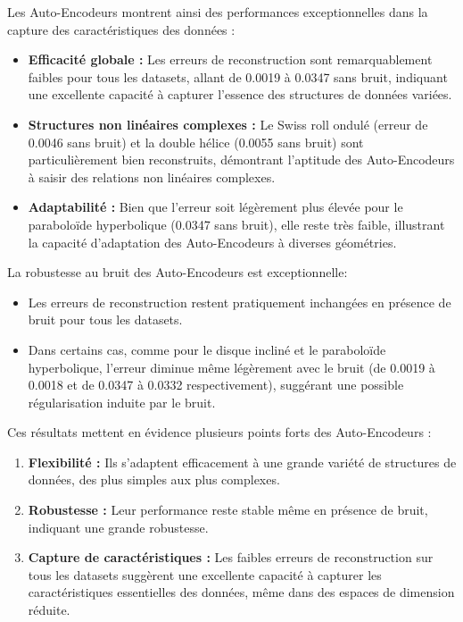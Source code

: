 \documentclass[unnumsec,webpdf,modern,large]{projet_manifold}%
\theoremstyle{thmstyleone}%
\theoremstyle{thmstyletwo}%
\theoremstyle{thmstylethree}%
\begin{document}
Les Auto-Encodeurs montrent ainsi des performances exceptionnelles dans la capture des caractéristiques des données :

\begin{itemize}
    \item \textbf{Efficacité globale :} Les erreurs de reconstruction sont remarquablement faibles pour tous les datasets, allant de 0.0019 à 0.0347 sans bruit, indiquant une excellente capacité à capturer l'essence des structures de données variées.
    
    \item \textbf{Structures non linéaires complexes :} Le Swiss roll ondulé (erreur de 0.0046 sans bruit) et la double hélice (0.0055 sans bruit) sont particulièrement bien reconstruits, démontrant l'aptitude des Auto-Encodeurs à saisir des relations non linéaires complexes.
    
    \item \textbf{Adaptabilité :} Bien que l'erreur soit légèrement plus élevée pour le paraboloïde hyperbolique (0.0347 sans bruit), elle reste très faible, illustrant la capacité d'adaptation des Auto-Encodeurs à diverses géométries.
\end{itemize}

La robustesse au bruit des Auto-Encodeurs est exceptionnelle:

\begin{itemize}
    \item Les erreurs de reconstruction restent pratiquement inchangées en présence de bruit pour tous les datasets.
    \item Dans certains cas, comme pour le disque incliné et le paraboloïde hyperbolique, l'erreur diminue même légèrement avec le bruit (de 0.0019 à 0.0018 et de 0.0347 à 0.0332 respectivement), suggérant une possible régularisation induite par le bruit.
\end{itemize}

Ces résultats mettent en évidence plusieurs points forts des Auto-Encodeurs :

\begin{enumerate}
    \item \textbf{Flexibilité :} Ils s'adaptent efficacement à une grande variété de structures de données, des plus simples aux plus complexes.
    \item \textbf{Robustesse :} Leur performance reste stable même en présence de bruit, indiquant une grande robustesse.
    \item \textbf{Capture de caractéristiques :} Les faibles erreurs de reconstruction sur tous les datasets suggèrent une excellente capacité à capturer les caractéristiques essentielles des données, même dans des espaces de dimension réduite.
\end{enumerate}
\end{document}
